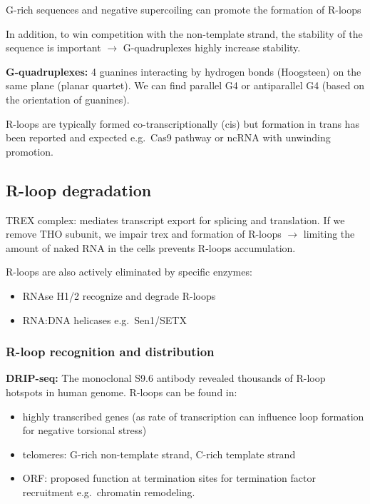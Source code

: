 G-rich sequences and negative supercoiling can promote the formation of R-loops

In addition, to win competition with the non-template strand, the stability of the sequence is important $\rightarrow$ G-quadruplexes highly increase stability.

\textbf{G-quadruplexes:} 4 guanines interacting by hydrogen bonds (Hoogsteen) on the same plane (planar quartet). We can find parallel G4 or antiparallel G4 (based on the orientation of guanines).

R-loops are typically formed co-transcriptionally (cis) but formation in trans has been reported and expected e.g.~Cas9 pathway or ncRNA with unwinding promotion.

\hypertarget{r-loop-degradation}{%
\subsection{R-loop degradation}\label{r-loop-degradation}}

TREX complex: mediates transcript export for splicing and translation. If we remove THO subunit, we impair trex and formation of R-loops $\rightarrow$ limiting the amount of naked RNA in the cells prevents R-loops accumulation.

R-loops are also actively eliminated by specific enzymes:
\begin{itemize}
\tightlist
\item
  RNAse H1/2 recognize and degrade R-loops
\item
  RNA:DNA helicases e.g.~Sen1/SETX
\end{itemize}

\hypertarget{r-loop-recognition-and-distribution}{%
\subsubsection{R-loop recognition and distribution}\label{r-loop-recognition-and-distribution}}

\textbf{DRIP-seq:} The monoclonal S9.6 antibody revealed thousands of R-loop hotspots in human genome. R-loops can be found in:
\begin{itemize}
\tightlist
\item
  highly transcribed genes (as rate of transcription can influence loop formation for negative torsional stress)
\item
  telomeres: G-rich non-template strand, C-rich template strand
\item
  ORF: proposed function at termination sites for termination factor recruitment e.g.~chromatin remodeling.
\end{itemize}

